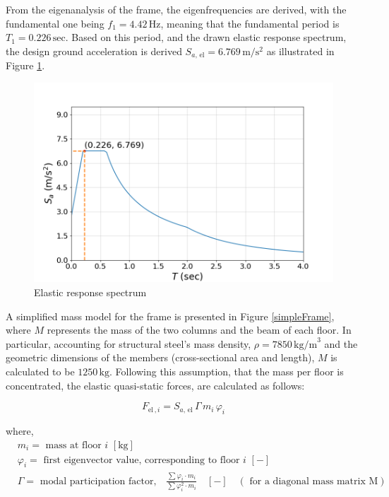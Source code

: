 From the eigenanalysis of the frame, the eigenfrequencies are derived, with the fundamental one being $f_1 = 4.42 \, \mathrm{Hz}$, meaning that the fundamental period is $T_1 = 0.226 \, \mathrm{sec}$. Based on this period, and the drawn elastic response spectrum, the design ground acceleration is derived $S_{a,\,\text{el}} = 6.769 \, \mathrm{m/s^2}$ as illustrated in Figure \ref{elSpec}. 

\begin{figure}[H]
    \centering
	\includegraphics[width=0.6\linewidth]{Figures/elasticSpectrumAg.png}
	\caption{Elastic response spectrum}
	\label{elSpec}
\end{figure}

A simplified mass model for the frame is presented in Figure \ref{simpleFrame}, where $M$ represents the mass of the two columns and the beam of each floor. In particular, accounting for structural steel's mass density, $\rho = 7850 \, \mathrm{kg/m}^3$ and the geometric dimensions of the members (cross-sectional area and length), $M$ is calculated to be $1250\, \mathrm{kg}$.  Following this assumption, that the mass per floor is concentrated, the elastic quasi-static forces, are calculated as follows:

\begin{equation}
    F_{\text{el}\,,i} = S_{a, \,\text{el}}\, \Gamma \, m_i \, \varphi _i 
\end{equation}

where,
$$
\begin{aligned}
&m_{i}=\text { mass at floor } i \,\, [\mathrm{kg}] \\
&\varphi_{i}=\text { first eigenvector value, corresponding to floor } i\,\,[-] \\
&\Gamma = \text{ modal participation factor,} \quad \frac{\sum \varphi_{i} \cdot m_{i}}{\sum \varphi_{i}^{2} \cdot m_{i}}\quad[-] \quad (\text { for a diagonal mass matrix } \mathrm{M})
\end{aligned}
$$

